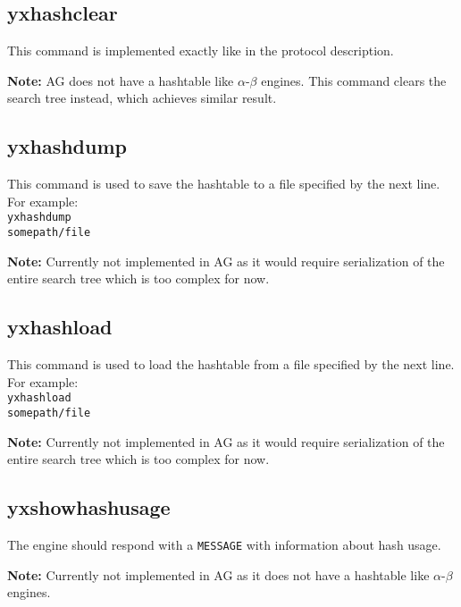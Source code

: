 \documentclass[12pt,a4paper]{article}
\begin{document}
\subsection{yxhashclear}
This command is implemented exactly like in the protocol description.

\textbf{Note:} AG does not have a hashtable like $\alpha$-$\beta$ engines. This command clears the search tree instead, which achieves similar result.

\subsection{yxhashdump}
This command is used to save the hashtable to a file specified by the next line. For example:
\\
\texttt{yxhashdump}\\
\texttt{somepath/file}

\textbf{Note:} Currently not implemented in AG as it would require serialization of the entire search tree which is too complex for now.

\subsection{yxhashload}
This command is used to load the hashtable from a file specified by the next line. For example:
\\
\texttt{yxhashload}\\
\texttt{somepath/file}

\textbf{Note:} Currently not implemented in AG as it would require serialization of the entire search tree which is too complex for now.

\subsection{yxshowhashusage}
The engine should respond with a \texttt{MESSAGE} with information about hash usage.

\textbf{Note:} Currently not implemented in AG as it does not have a hashtable like $\alpha$-$\beta$ engines.
\end{document}
